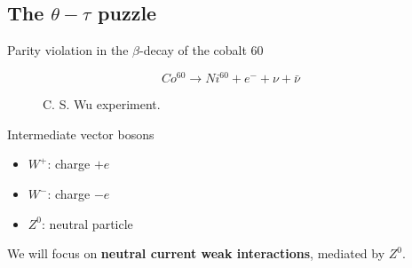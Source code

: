 \documentclass[10pt]{beamer}
\begin{document}
\subsection{The $\theta-\tau$ puzzle}


\begin{frame}{Parity violation in the $\beta$-decay of the cobalt 60}

	\begin{equation}
		Co^{60} \rightarrow Ni^{60} + e^{-} + \nu + \bar{\nu}
	\end{equation}

	\begin{figure}[h!]
		\centering
		\caption{C. S. Wu experiment.}
		\label{fig:wu}
	\end{figure}

\end{frame}

\begin{frame}{Intermediate vector bosons}

	\begin{itemize}

		\item $W^{+}$: charge $+\textit{e}$
		\item $W^{-}$: charge $-\textit{e}$
		\item $Z^{0}$: neutral particle 

	\end{itemize}

We will focus on \textbf{neutral current weak interactions}, mediated by $Z^{0}$.


\end{frame}
\end{document}

